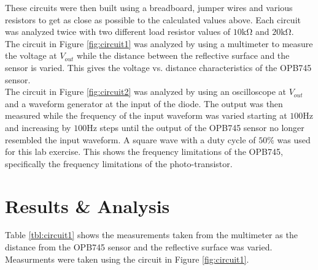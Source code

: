 \documentclass[CMPE]{KGCOEReport}
\begin{document}
These circuits were then built using a breadboard, jumper wires and various 
resistors to get as close as possible to the calculated values above.
Each circuit was analyzed twice with two different load resistor values of 
$10\si{\kilo\ohm}$ and $20\si{\kilo\ohm}$. \\

The circuit in Figure \ref{fig:circuit1} was analyzed by using a multimeter to measure the voltage 
at $V_{out}$ while the distance between the reflective surface and the sensor is varied.
This gives the voltage vs. distance characteristics of the OPB745 sensor.\\

The circuit in Figure \ref{fig:circuit2} was analyzed by using an oscilloscope at $V_{out}$ and 
a waveform generator at the input of the diode. The output was then measured while the frequency
of the input waveform was varied starting at $100\si\hertz$ and increasing by $100\si\hertz$ steps
until the output of the OPB745 sensor no longer resembled the input waveform. A square wave with a duty
cycle of $50\%$ was used for this lab exercise. This shows the frequency limitations of the OPB745, specifically
the frequency limitations of the photo-transistor.



\section{Results \& Analysis}

Table \ref{tbl:circuit1} shows the measurements taken from the multimeter as the distance
from the OPB745 sensor and the reflective surface was varied. Measurments were taken using the
circuit in Figure \ref{fig:circuit1}.
\end{document}

